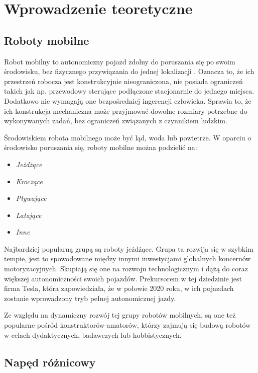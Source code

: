 \chapter{Wprowadzenie teoretyczne}

\section{Roboty mobilne}

Robot mobilny to autonomiczny pojazd zdolny do poruszania się po swoim środowisku, bez fizycznego przywiązania do jednej lokalizacji \cite{mobile_robot}. Oznacza to, że ich przestrzeń robocza jest konstrukcyjnie nieograniczona, nie posiada ograniczeń takich jak np. przewodowy sterujące podłączone stacjonarnie do jednego miejsca. Dodatkowo nie wymagają one bezpośredniej ingerencji człowieka. Sprawia to, że ich konstrukcja mechaniczna może przyjmować dowolne rozmiary potrzebne do wykonywanych zadań, bez ograniczeń związanych z czynnikiem ludzkim. 

Środowiskiem robota mobilnego może być ląd, woda lub powietrze. W oparciu o środowisko poruszania się, roboty mobilne można podzielić na:

\begin{itemize}
\item
 \textit{Jeżdżące}
 \item
 \textit{Kroczące}
 \item 
 \textit{Pływające}
 \item 
 \textit{Latające} 
 \item 
 \textit{Inne}
\end{itemize}

 Najbardziej popularną grupą są roboty jeżdżące. Grupa ta rozwija się w szybkim tempie, jest to spowodowane między innymi inwestycjami globalnych koncernów motoryzacyjnych. Skupiają się one na rozwoju technologicznym i dążą do coraz większej autonomiczności swoich pojazdów. Prekursorem w tej dziedzinie jest firma Tesla, która zapowiedziała, że  w połowie 2020 roku, w ich pojazdach zostanie wprowadzony tryb pełnej autonomicznej jazdy. 
 
 Ze względu na dynamiczny rozwój tej grupy robotów mobilnych, są one też popularne pośród konstruktorów-amatorów, którzy zajmują się budową robotów w celach dydaktycznych, badawczych lub hobbistycznych.  
\section{Napęd różnicowy}

